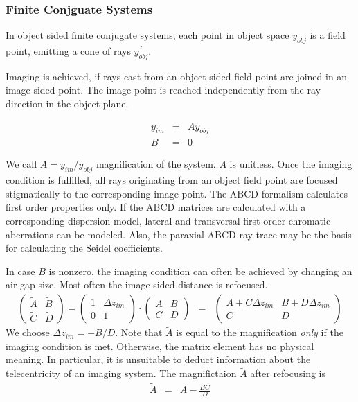 \documentclass[12pt,a4paper,twoside,openright,BCOR10mm,headsepline,titlepage,abstracton,chapterprefix,final]{scrreprt}
\begin{document}
\subsubsection{Finite Conjguate Systems}
In object sided finite conjugate systems, each point in object space $y_{obj}$ is a field point, 
emitting a cone of rays $y_{obj}^{\,\prime}$.

Imaging is achieved, if rays cast from an object sided field point are joined in an image sided point.
The image point is reached independently from the ray direction in the object plane.

\begin{eqnarray}
   y_{im} &=& A y_{obj} \\
   B &=& 0
\end{eqnarray}

We call $A = y_{im} / y_{obj}$ magnification of the system.
$A$ is unitless.
Once the imaging condition is fulfilled, all rays originating from an object field point are focused stigmatically to the corresponding image point. 
The ABCD formalism calculates first order properties only.
If the ABCD matrices are calculated with a corresponding dispersion model, lateral and transversal first order chromatic aberrations can be modeled.
Also, the paraxial ABCD ray trace may be the basis for calculating the Seidel coefficients.

In case $B$ is nonzero, the imaging condition can often be achieved by changing an air gap size. Most often the image sided distance is refocused.
\begin{eqnarray}
 \begin{pmatrix}
  \tilde{A} & \tilde{B} \\ \tilde{C} & \tilde{D}
 \end{pmatrix}
 =
 \begin{pmatrix}
  1 & \Delta z_{im} \\ 0 & 1
 \end{pmatrix}
 \cdot
 \begin{pmatrix}
  A & B \\ C & D
 \end{pmatrix}
 &=&
  \begin{pmatrix}
  A + C \Delta z_{im} & B + D \Delta z_{im} \\ C & D
 \end{pmatrix}
 \label{eq:abcd_refocusing}
\end{eqnarray}
We choose $\Delta z_{im} = - B / D $. Note that $\tilde{A}$ is equal to the magnification \emph{only} if the imaging condition is met. 
Otherwise, the matrix element has no physical meaning.
In particular, it is unsuitable to deduct information about the telecentricity of an imaging system.
The magnifictaion $\tilde{A}$ after refocusing is
\begin{eqnarray}
 \tilde{A} &=& A - \frac{BC}{D}
\end{eqnarray}
\end{document}
